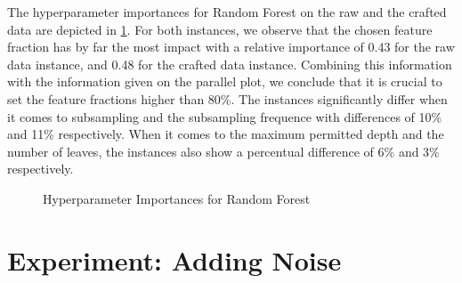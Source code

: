 The hyperparameter importances for Random Forest on the raw and the crafted data are depicted in \ref{fig:RF_Importances}. For both instances, we observe that the chosen feature fraction has by far the most impact with a relative importance of 0.43 for the raw data instance, and 0.48 for the crafted data instance. Combining this information with the information given on the parallel plot, we conclude that it is crucial to set the feature fractions higher than 80\%. The instances significantly differ when it comes to subsampling and the subsampling frequence with differences of 10\% and 11\% respectively. When it comes to the maximum permitted depth and the number of leaves, the instances also show a percentual difference of 6\% and 3\% respectively.
\begin{figure}[h]
	\centering
	\caption{Hyperparameter Importances for Random Forest}
	\label{fig:RF_Importances}
\end{figure} 
 
\section{Experiment: Adding Noise}\label{sec:noise}







